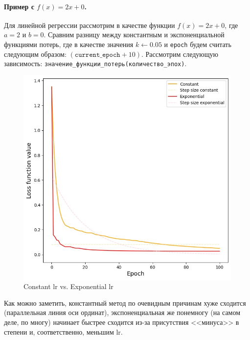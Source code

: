 \documentclass[12pt, a4paper, oneside, final]{article}
\begin{document}
	\paragraph{Пример с $f(x) = 2x + 0$.}
	Для линейной регрессии рассмотрим в качестве функции $f(x) = 2x + 0$, где $a = 2$ и $b = 0$.
	Сравним разницу между константным и экспоненциальной функциями потерь, где в качестве значения $k \gets 0.05$ и \texttt{epoch} будем считать следующим образом: $(\texttt{current\_epoch} + 10)$.
	Рассмотрим следующую зависимость: \texttt{значение\_функции\_потерь(количество\_эпох)}.
	\begin{figure}[H]
		\centering
		\includegraphics[scale = 0.68]{Image/T1_SGD_constantLR_expLR.jpeg}
		\caption*{Constant lr vs. Exponential lr}
	\end{figure}
	Как можно заметить, константный метод по очевидным причинам хуже сходится (параллельная линия оси ординат), экспоненциальная же понемногу (на самом деле, по многу) начинает быстрее сходится из-за присутствия <<минуса>> в степени и, соответственно, меньшим lr.
\end{document}
